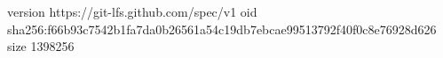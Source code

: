 version https://git-lfs.github.com/spec/v1
oid sha256:f66b93c7542b1fa7da0b26561a54c19db7ebcae99513792f40f0c8e76928d626
size 1398256
